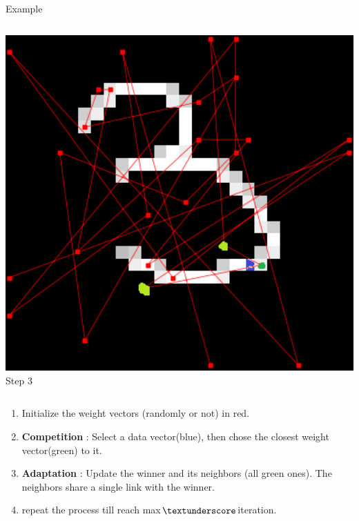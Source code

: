 \documentclass{beamer}
\begin{document}
\begin{frame}{Example}
\begin{columns}
    
			\begin{column}{0.33\textwidth}
      
				\centering
      				\includegraphics[width=1\textwidth]{pics/algo_1_3.png}
Step 3
    			\end{column}
		\end{columns}




               	\begin{enumerate}

                        \item Initialize the weight vectors (randomly or not) in red.
			\item \textbf{Competition} : Select a data vector(blue), then chose the closest weight vector(green) to it.
			\item \textbf{Adaptation} : Update the winner and its neighbors (all green ones). The neighbors share a single link with the winner.
                        \item repeat the process till reach max$\textunderscore$iteration.
                \end{enumerate}
        \end{frame}
\end{document}
